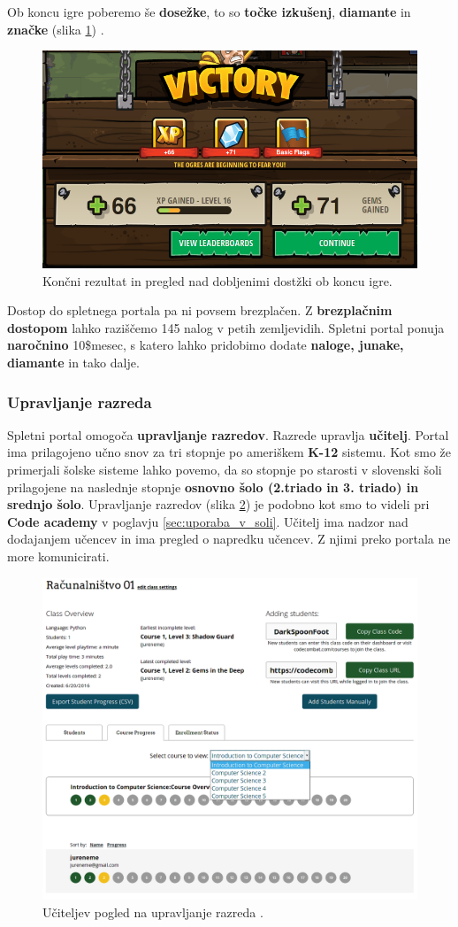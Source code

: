  Ob koncu igre poberemo še \textbf{dosežke}, to so \textbf{točke
   izkušenj}, \textbf{diamante} in \textbf{značke} (slika
 \ref{fig:web:cc:ingame:ach}) . 

\begin{figure}[h!]
  \centering
    \includegraphics [width=0.35\linewidth, keepaspectratio =
   1] {./images/sc_web/cc_ingame-ach-v02.png}
   \caption{Končni rezultat in pregled nad dobljenimi dostžki ob koncu
     igre\cite{web:codecombat}.}
   \label{fig:web:cc:ingame:ach}
 \end{figure}

 Dostop do spletnega portala pa ni povsem brezplačen. Z
 \textbf{brezplačnim dostopom} lahko raziščemo 145 nalog v petih
 zemljevidih. Spletni portal ponuja \textbf{naročnino} 10\$\/mesec, s
 katero lahko pridobimo dodate \textbf{naloge, junake, diamante} in
 tako dalje.
 
\subsubsection{Upravljanje razreda}
\label{sec:upravljanje_razreda}

Spletni portal omogoča \textbf{upravljanje razredov}. Razrede upravlja
\textbf{učitelj}.  Portal ima prilagojeno učno snov za tri stopnje po
ameriškem \textbf{K-12} sistemu. Kot smo že primerjali šolske sisteme
lahko povemo, da so stopnje po starosti v slovenski šoli prilagojene
na naslednje stopnje \textbf{osnovno šolo (2.triado in 3. triado) in
  srednjo šolo}. Upravljanje razredov (slika \ref{fig:web:cc:teach})
je podobno kot smo to videli pri \textbf{Code academy} v poglavju
\ref{sec:uporaba_v_soli}. Učitelj ima nadzor nad dodajanjem učencev in
ima pregled o napredku učencev. Z njimi preko portala ne more
komunicirati.

\begin{figure}[h!]
  \centering
    \includegraphics [width=0.75\linewidth, keepaspectratio =
   1] {./images/sc_web/cc_teach-clsv-v01.png}
   \caption{Učiteljev pogled na upravljanje razreda \cite{web:codecombat}.}
   \label{fig:web:cc:teach}
\end{figure}

